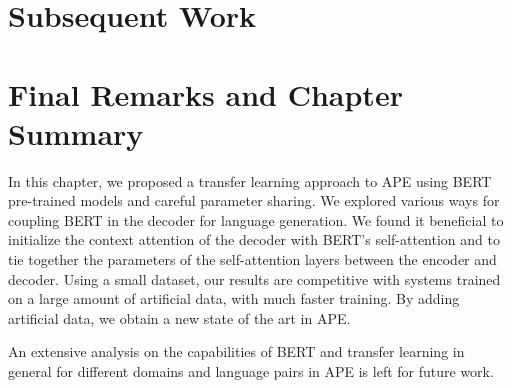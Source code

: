 \section{Subsequent Work}

\section{Final Remarks and Chapter Summary}

In this chapter, we proposed a transfer learning approach to APE using
BERT pre-trained models and careful parameter sharing. We explored
various ways for coupling BERT in the decoder for language
generation. We found it beneficial to initialize the context
attention of the decoder with BERT's self-attention and to tie
together the parameters of the self-attention layers between the
encoder and decoder. Using a small dataset, our results are
competitive with systems trained on a large amount of artificial
data, with much faster training. By adding artificial data, we obtain
a new state of the art in APE.

An extensive analysis on the capabilities of BERT and transfer
learning in general for different domains and language pairs in APE
is left for future work.

\cleardoublepage
